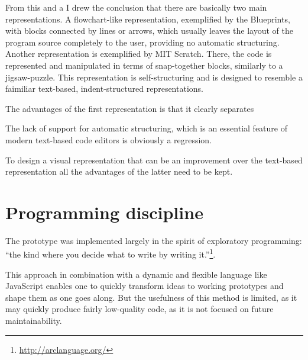 From this and a I drew the conclusion that there are basically two main representations. A flowchart-like representation, exemplified by the Blueprints, with blocks connected by lines or arrows, which usually leaves the layout of the program source completely to the user, providing no automatic structuring. Another representation is exemplified by MIT Scratch. There, the code is represented and manipulated in terms of snap-together blocks, similarly to a jigsaw-puzzle. This representation is self-structuring and is designed to resemble a faimiliar text-based, indent-structured representations.

The advantages of the first representation is that it clearly separates


The lack of support for automatic structuring, which is an essential feature of modern text-based code editors is obviously a regression.

To design a visual representation that can be an improvement over the text-based representation all the advantages of the latter need to be kept.



\section{Programming discipline}
The prototype was implemented largely in the spirit of exploratory programming: ``the kind where you decide what to write by writing it.''\footnote{\url{http://arclanguage.org/}}.

This approach in combination with a dynamic and flexible language like JavaScript enables one to quickly transform ideas to working prototypes and shape them as one goes along. But the usefulness of this method is limited, as it may quickly produce fairly low-quality code, as it is not focused on future maintainability.

